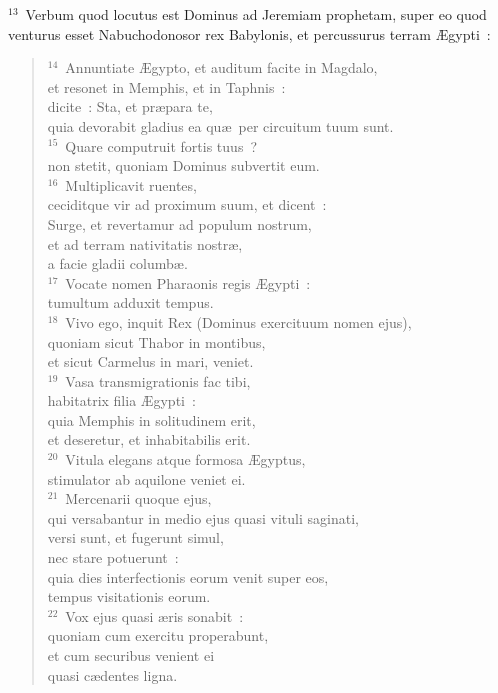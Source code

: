 ${}^{13}$~Verbum quod locutus est Dominus ad Jeremiam prophetam, super eo quod venturus esset Nabuchodonosor rex Babylonis, et percussurus terram \AE gypti~:
\begin{flushleft}\begin{verse}${}^{14}$~Annuntiate \AE gypto, et auditum facite in Magdalo,\\ et resonet in Memphis, et in Taphnis~:\\ dicite~: Sta, et pr\ae para te,\\ quia devorabit gladius ea qu\ae\ per circuitum tuum sunt.\\
${}^{15}$~Quare computruit fortis tuus~?\\ non stetit, quoniam Dominus subvertit eum.\\
${}^{16}$~Multiplicavit ruentes,\\ ceciditque vir ad proximum suum, et dicent~:\\ Surge, et revertamur ad populum nostrum,\\ et ad terram nativitatis nostr\ae ,\\ a facie gladii columb\ae .\\
${}^{17}$~Vocate nomen Pharaonis regis \AE gypti~:\\ tumultum adduxit tempus.\\
${}^{18}$~Vivo ego, inquit Rex (Dominus exercituum nomen ejus),\\ quoniam sicut Thabor in montibus,\\ et sicut Carmelus in mari, veniet.\\
${}^{19}$~Vasa transmigrationis fac tibi,\\ habitatrix filia \AE gypti~:\\ quia Memphis in solitudinem erit,\\ et deseretur, et inhabitabilis erit.\\
${}^{20}$~Vitula elegans atque formosa \AE gyptus,\\ stimulator ab aquilone veniet ei.\\
${}^{21}$~Mercenarii quoque ejus,\\ qui versabantur in medio ejus quasi vituli saginati,\\ versi sunt, et fugerunt simul,\\ nec stare potuerunt~:\\ quia dies interfectionis eorum venit super eos,\\ tempus visitationis eorum.\\
${}^{22}$~Vox ejus quasi \ae ris sonabit~:\\ quoniam cum exercitu properabunt,\\ et cum securibus venient ei\\ quasi c\ae dentes ligna.\\

\end{verse}
\end{flushleft}
